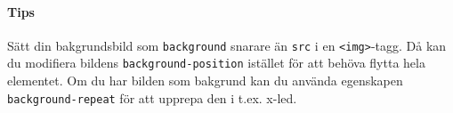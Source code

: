 \documentclass[12pt]{article}
\begin{document}
  \paragraph{Tips} Sätt din bakgrundsbild som \texttt{background} snarare än \texttt{src} i en \texttt{<img>}-tagg. Då kan du modifiera bildens \texttt{background-position} istället för att behöva flytta hela elementet. Om du har bilden som bakgrund kan du använda egenskapen \texttt{background-repeat} för att upprepa den i t.ex. x-led.
\end{document}
